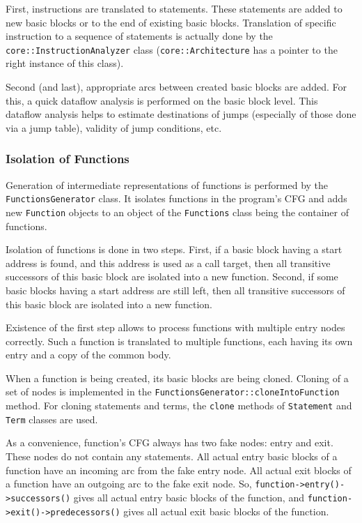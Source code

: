 \documentclass[a4paper,12pt]{article}
\newcommand{\ident}[1]{\texttt{#1}}
\begin{document}
First, instructions are translated to statements.
These statements are added to new basic blocks or to the end of existing basic blocks.
Translation of specific instruction to a sequence of statements is actually done by the \ident{core::InstructionAnalyzer} class (\ident{core::Architecture} has a pointer to the right instance of this class).

Second (and last), appropriate arcs between created basic blocks are added.
For this, a quick dataflow analysis is performed on the basic block level.
This dataflow analysis helps to estimate destinations of jumps (especially of those done via a jump table), validity of jump conditions, etc.

\subsubsection{Isolation of Functions}

Generation of intermediate representations of functions is performed by the \ident{FunctionsGenerator} class.
It isolates functions in the program's CFG and adds new \ident{Function} objects to an object of the \ident{Functions} class being the container of functions.

Isolation of functions is done in two steps.
First, if a basic block having a start address is found, and this address is used as a call target, then all transitive successors of this basic block are isolated into a new function.
Second, if some basic blocks having a start address are still left, then all transitive successors of this basic block are isolated into a new function.

Existence of the first step allows to process functions with multiple entry nodes correctly.
Such a function is translated to multiple functions, each having its own entry and a copy of the common body.

When a function is being created, its basic blocks are being cloned.
Cloning of a set of nodes is implemented in the \ident{FunctionsGenerator::cloneIntoFunction} method.
For cloning statements and terms, the \ident{clone} methods of \ident{Statement} and \ident{Term} classes are used.

As a convenience, function's CFG always has two fake nodes: entry and exit.
These nodes do not contain any statements.
All actual entry basic blocks of a function have an incoming arc from the fake entry node.
All actual exit blocks of a function have an outgoing arc to the fake exit node.
So, \ident{function->entry()->successors()} gives all actual entry basic blocks of the function, and \ident{function->exit()->predecessors()} gives all actual exit basic blocks of the function.
\end{document}
